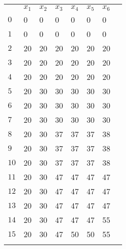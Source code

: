 \documentclass[12pt]{article}
\begin{document}
\begin{tabular}{l *{6}{>{}l} l}
\rowcolor{white}%
& $x_{1}$ & $x_{2}$ & $x_{3}$ & $x_{4}$ & $x_{5}$ & $x_{6}$ \\
$0$ & \cellcolor{red!20}0 & \cellcolor{red!20}0 & \cellcolor{red!20}0 & \cellcolor{red!20}0 & \cellcolor{red!20}0 & \cellcolor{red!20}0 \\
$1$ & \cellcolor{red!20}0 & \cellcolor{red!20}0 & \cellcolor{red!20}0 & \cellcolor{red!20}0 & \cellcolor{red!20}0 & \cellcolor{red!20}0 \\
$2$ & \cellcolor{green!20}20 & \cellcolor{red!20}20 & \cellcolor{red!20}20 & \cellcolor{red!20}20 & \cellcolor{red!20}20 & \cellcolor{red!20}20 \\
$3$ & \cellcolor{green!20}20 & \cellcolor{red!20}20 & \cellcolor{red!20}20 & \cellcolor{red!20}20 & \cellcolor{red!20}20 & \cellcolor{red!20}20 \\
$4$ & \cellcolor{green!20}20 & \cellcolor{red!20}20 & \cellcolor{red!20}20 & \cellcolor{red!20}20 & \cellcolor{red!20}20 & \cellcolor{red!20}20 \\
$5$ & \cellcolor{green!20}20 & \cellcolor{green!20}30 & \cellcolor{red!20}30 & \cellcolor{red!20}30 & \cellcolor{red!20}30 & \cellcolor{red!20}30 \\
$6$ & \cellcolor{green!20}20 & \cellcolor{green!20}30 & \cellcolor{red!20}30 & \cellcolor{red!20}30 & \cellcolor{red!20}30 & \cellcolor{red!20}30 \\
$7$ & \cellcolor{green!20}20 & \cellcolor{green!20}30 & \cellcolor{red!20}30 & \cellcolor{red!20}30 & \cellcolor{red!20}30 & \cellcolor{red!20}30 \\
$8$ & \cellcolor{green!20}20 & \cellcolor{green!20}30 & \cellcolor{green!20}37 & \cellcolor{red!20}37 & \cellcolor{red!20}37 & \cellcolor{green!20}38 \\
$9$ & \cellcolor{green!20}20 & \cellcolor{green!20}30 & \cellcolor{green!20}37 & \cellcolor{red!20}37 & \cellcolor{red!20}37 & \cellcolor{green!20}38 \\
$10$ & \cellcolor{green!20}20 & \cellcolor{green!20}30 & \cellcolor{green!20}37 & \cellcolor{red!20}37 & \cellcolor{red!20}37 & \cellcolor{green!20}38 \\
$11$ & \cellcolor{green!20}20 & \cellcolor{green!20}30 & \cellcolor{green!20}47 & \cellcolor{red!20}47 & \cellcolor{red!20}47 & \cellcolor{red!20}47 \\
$12$ & \cellcolor{green!20}20 & \cellcolor{green!20}30 & \cellcolor{green!20}47 & \cellcolor{red!20}47 & \cellcolor{red!20}47 & \cellcolor{red!20}47 \\
$13$ & \cellcolor{green!20}20 & \cellcolor{green!20}30 & \cellcolor{green!20}47 & \cellcolor{red!20}47 & \cellcolor{red!20}47 & \cellcolor{red!20}47 \\
$14$ & \cellcolor{green!20}20 & \cellcolor{green!20}30 & \cellcolor{green!20}47 & \cellcolor{red!20}47 & \cellcolor{red!20}47 & \cellcolor{green!20}55 \\
$15$ & \cellcolor{green!20}20 & \cellcolor{green!20}30 & \cellcolor{green!20}47 & \cellcolor{green!20}50 & \cellcolor{red!20}50 & \cellcolor{green!20}55 \\
\rowcolor{white}%
\end{tabular}\\
\end{document}

